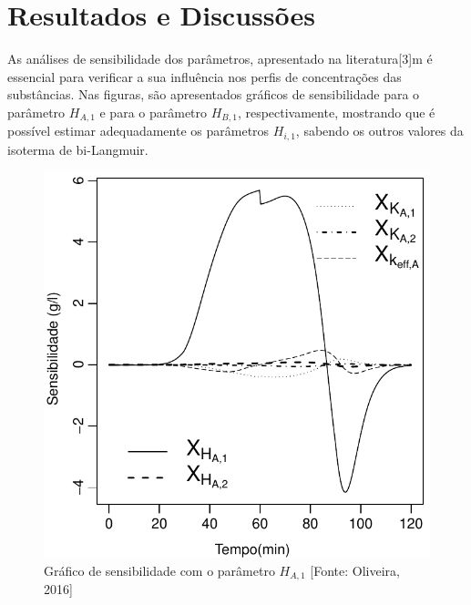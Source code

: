 \documentclass[por]{Template_SBEF}
\begin{document}
\section{Resultados e Discussões}
As análises de sensibilidade dos parâmetros, apresentado na literatura[3]m é essencial para verificar a sua influência nos perfis de concentrações das substâncias. Nas figuras, são apresentados gráficos de sensibilidade para o parâmetro $H_{A,1}$ e para o parâmetro $H_{B,1}$, respectivamente, mostrando que é possível estimar adequadamente os parâmetros $H_{i,1}$, sabendo os outros valores da isoterma de bi-Langmuir.




\begin{figure}[H] 
	\centering
	\includegraphics[width=.8\columnwidth]{Arquivos/SensibilidadeCa-all.pdf} 
	\caption{Gráfico de sensibilidade com o parâmetro $H_{A,1}$ [Fonte: Oliveira, 2016]} 
\end{figure}
\end{document}
